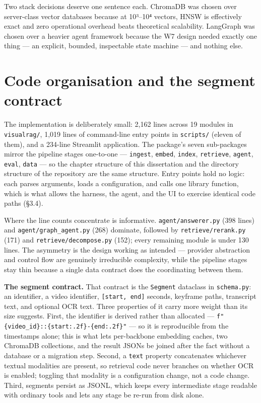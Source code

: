 Two stack decisions deserve one sentence each. ChromaDB was chosen over
server-class vector databases because at 10³--10⁴ vectors, HNSW is
effectively exact and zero operational overhead beats theoretical
scalability. LangGraph was chosen over a heavier agent framework because
the W7 design needed exactly one thing --- an explicit, bounded,
inspectable state machine --- and nothing else.

\section{Code organisation and the segment
contract}

The implementation is deliberately small: 2,162 lines across 19 modules
in \texttt{visualrag/}, 1,019 lines of command-line entry points in
\texttt{scripts/} (eleven of them), and a 234-line Streamlit
application. The package's seven sub-packages mirror the pipeline stages
one-to-one --- \texttt{ingest}, \texttt{embed}, \texttt{index},
\texttt{retrieve}, \texttt{agent}, \texttt{eval}, \texttt{data} --- so
the chapter structure of this dissertation and the directory structure
of the repository are the same structure. Entry points hold no logic:
each parses arguments, loads a configuration, and calls one library
function, which is what allows the harness, the agent, and the UI to
exercise identical code paths (§3.4).

Where the line counts concentrate is informative.
\texttt{agent/answerer.py} (398 lines) and
\texttt{agent/graph\_agent.py} (268) dominate, followed by
\texttt{retrieve/rerank.py} (171) and \texttt{retrieve/decompose.py}
(152); every remaining module is under 130 lines. The asymmetry is the
design working as intended --- provider abstraction and control flow are
genuinely irreducible complexity, while the pipeline stages stay thin
because a single data contract does the coordinating between them.

\textbf{The segment contract.} That contract is the \texttt{Segment}
dataclass in \texttt{schema.py}: an identifier, a video identifier,
\texttt{{[}start,\ end{]}} seconds, keyframe paths, transcript text, and
optional OCR text. Three properties of it carry more weight than its
size suggests. First, the identifier is derived rather than allocated
--- \texttt{f"\{video\_id\}::\{start:.2f\}-\{end:.2f\}"} --- so it is
reproducible from the timestamps alone; this is what lets per-backbone
embedding caches, two ChromaDB collections, and the result JSONs be
joined after the fact without a database or a migration step. Second, a
\texttt{text} property concatenates whichever textual modalities are
present, so retrieval code never branches on whether OCR is enabled;
toggling that modality is a configuration change, not a code change.
Third, segments persist as JSONL, which keeps every intermediate stage
readable with ordinary tools and lets any stage be re-run from disk
alone.

